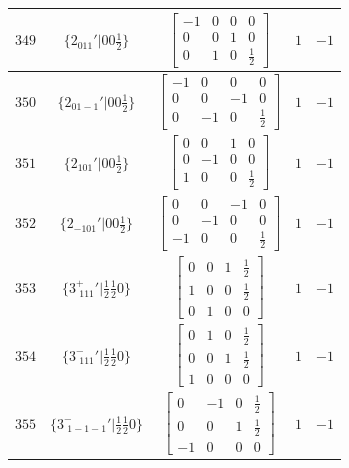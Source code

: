 \documentclass[fleqn,8pt]{jsarticle}
\begin{document}
\begin{longtable}{ccccc}
$ 349 $ & $ \{2{}_{011}{}'|0 0 \frac{1}{2}\} $ & $ \begin{bmatrix} -1 & 0 & 0 & 0 \\ 0 & 0 & 1 & 0 \\ 0 & 1 & 0 & \frac{1}{2} \end{bmatrix} $ & $ 1 $ & $ -1 $ \\ \hline
$ 350 $ & $ \{2{}_{01-1}{}'|0 0 \frac{1}{2}\} $ & $ \begin{bmatrix} -1 & 0 & 0 & 0 \\ 0 & 0 & -1 & 0 \\ 0 & -1 & 0 & \frac{1}{2} \end{bmatrix} $ & $ 1 $ & $ -1 $ \\ \hline
$ 351 $ & $ \{2{}_{101}{}'|0 0 \frac{1}{2}\} $ & $ \begin{bmatrix} 0 & 0 & 1 & 0 \\ 0 & -1 & 0 & 0 \\ 1 & 0 & 0 & \frac{1}{2} \end{bmatrix} $ & $ 1 $ & $ -1 $ \\ \hline
$ 352 $ & $ \{2{}_{-101}{}'|0 0 \frac{1}{2}\} $ & $ \begin{bmatrix} 0 & 0 & -1 & 0 \\ 0 & -1 & 0 & 0 \\ -1 & 0 & 0 & \frac{1}{2} \end{bmatrix} $ & $ 1 $ & $ -1 $ \\ \hline
$ 353 $ & $ \{3^{+}_{\,\,111}{}'|\frac{1}{2} \frac{1}{2} 0\} $ & $ \begin{bmatrix} 0 & 0 & 1 & \frac{1}{2} \\ 1 & 0 & 0 & \frac{1}{2} \\ 0 & 1 & 0 & 0 \end{bmatrix} $ & $ 1 $ & $ -1 $ \\ \hline
$ 354 $ & $ \{3^{-}_{\,\,111}{}'|\frac{1}{2} \frac{1}{2} 0\} $ & $ \begin{bmatrix} 0 & 1 & 0 & \frac{1}{2} \\ 0 & 0 & 1 & \frac{1}{2} \\ 1 & 0 & 0 & 0 \end{bmatrix} $ & $ 1 $ & $ -1 $ \\ \hline
$ 355 $ & $ \{3^{-}_{\,\,1-1-1}{}'|\frac{1}{2} \frac{1}{2} 0\} $ & $ \begin{bmatrix} 0 & -1 & 0 & \frac{1}{2} \\ 0 & 0 & 1 & \frac{1}{2} \\ -1 & 0 & 0 & 0 \end{bmatrix} $ & $ 1 $ & $ -1 $ \\ \hline

\end{longtable}
\end{document}
